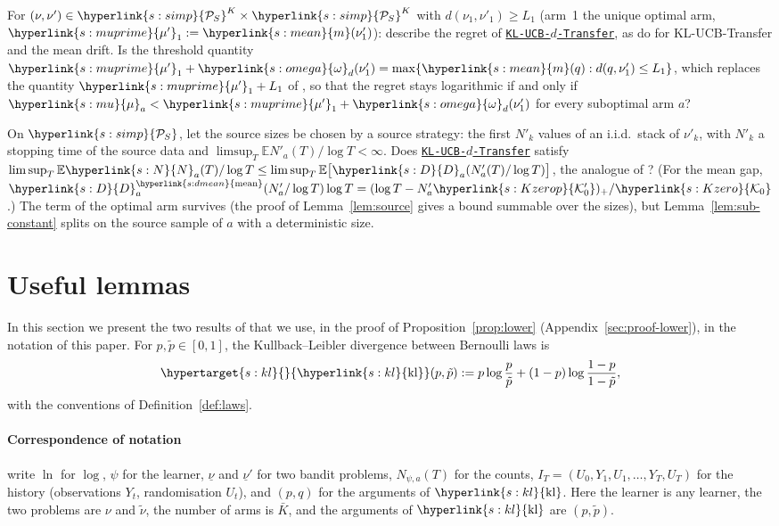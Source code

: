 \documentclass[11pt]{article}
\newcommand{\E}{\mathbb{E}}
\newcommand{\dt}[1]{\hypertarget{#1}{}}
\newcommand{\sy}[2]{{\hyperlink{#1}{#2}}}
\newcommand{\Simp}{\sy{s:simp}{\mathcal{P}_{S}}}
\newcommand{\mean}{\sy{s:mean}{m}}
\newcommand{\dmean}{\sy{s:dmean}{\mathrm{mean}}}
\newcommand{\mk}{\sy{s:mu}{\mu}}
\newcommand{\mkp}{\sy{s:muprime}{\mu'}}
\newcommand{\Nc}{\sy{s:N}{N}}
\newcommand{\Dc}{\sy{s:D}{D}}
\newcommand{\Ko}{\sy{s:Kzero}{\mathcal{K}_{0}}}
\newcommand{\Kop}{\sy{s:Kzerop}{\mathcal{K}'_{0}}}
\newcommand{\om}{\sy{s:omega}{\omega}}
\newcommand{\Alg}{\hyperref[alg:index]{\texttt{KL-UCB-$d$-Transfer}}}
\newcommand{\kl}{\sy{s:kl}{\mathrm{kl}}}
\begin{document}
\begin{openquestion}[Misspecification]\label{oq:misspecification}
For $(\nu,\nu')\in\Simp^K\times\Simp^K$ with $d(\nu_1,\nu'_1)\ge L_1$ (arm~1 the unique optimal arm,
$\mkp_1:=\mean(\nu'_1)$): describe the regret of \Alg{}, as \citet[Theorem~5]{PMRM26} do for
KL-UCB-Transfer and the mean drift. Is the threshold quantity
$\mkp_1+\om_d(\nu'_1)=\max\{\mean(q):d(q,\nu'_1)\le L_1\}$, which replaces the quantity
$\mkp_1+L_1$ of \citet[Theorem~5]{PMRM26}, so that the regret stays logarithmic if and only if
$\mk_a<\mkp_1+\om_d(\nu'_1)$ for every suboptimal arm $a$?
\end{openquestion}

\begin{openquestion}\label{oq:random}
On $\Simp$, let the source sizes be chosen by a source strategy: the first $N'_k$ values of an
i.i.d.\ stack of $\nu'_k$, with $N'_k$ a stopping time of the source data and
$\limsup_T\E N'_a(T)/\log T<\infty$. Does \Alg{} satisfy
$\limsup_T\E \Nc_a(T)/\log T\le\limsup_T\E\big[\Dc_a(N'_a(T)/\log T)\big]$, the analogue of
\citet[Theorem~3(i)]{PMRM26}? (For the mean gap,
$\Dc^{\dmean}_a(N'_a/\log T)\log T=(\log T-N'_a\Kop)_+/\Ko$.) The term of the optimal arm survives
(the proof of Lemma~\ref{lem:source} gives a bound summable over the sizes), but
Lemma~\ref{lem:sub-constant} splits on the source sample of $a$ with a deterministic size.
\end{openquestion}

\clearpage
\appendix

\section{Useful lemmas}\label{sec:cited}

In this section we present the two results of \citet{GMS19} that we use, in the proof of
Proposition~\ref{prop:lower} (Appendix~\ref{sec:proof-lower}), in the notation of this paper. For
$p,\tilde p\in[0,1]$, the Kullback--Leibler divergence between Bernoulli laws \citep[(5)]{GMS19} is
\begin{equation*}
\dt{s:kl}\kl(p,\tilde p):=p\log\frac{p}{\tilde p}+(1-p)\log\frac{1-p}{1-\tilde p},
\end{equation*}
with the conventions of Definition~\ref{def:laws}.

\paragraph{Correspondence of notation} \citet{GMS19} write $\ln$ for $\log$, $\psi$ for the learner,
$\underline\nu$ and $\underline\nu'$ for two bandit problems, $N_{\psi,a}(T)$ for the counts,
$I_T=(U_0,Y_1,U_1,\dots,Y_T,U_T)$ for the history (observations $Y_t$, randomisation $U_t$), and
$(p,q)$ for the arguments of $\kl$. Here the learner is any learner, the two problems are $\nu$ and
$\tilde\nu$, the number of arms is $\bar K$, and the arguments of $\kl$ are $(p,\tilde p)$.
\end{document}
